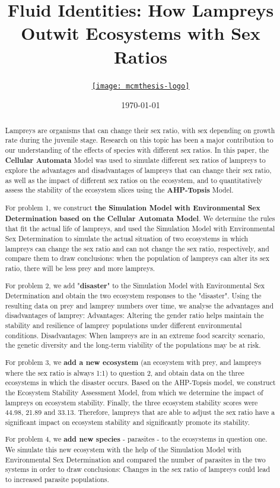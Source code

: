 \documentclass{mcmthesis}
\title{Fluid Identities: How Lampreys Outwit Ecosystems with Sex Ratios}
\author{\small \href{https://www.latexstudio.net/}
  {\texttt{[image: mcmthesis-logo]}}}
\date{\today}
\begin{document}
\begin{abstract}
\par Lampreys are organisms that can change their sex ratio, with sex depending on growth rate during the juvenile stage. Research on this topic has been a major contribution to our understanding of the effects of species with different sex ratios. In this paper, the \textbf{Cellular Automata} Model was used to simulate different sex ratios of lampreys to explore the advantages and disadvantages of lampreys that can change their sex ratio, as well as the impact of different sex ratios on the ecosystem, and to quantitatively assess the stability of the ecosystem slices using the \textbf{AHP-Topsis} Model.

For problem 1, we construct \textbf{the Simulation Model with Environmental Sex Determination based on the Cellular Automata Model}. We determine the rules that fit the actual life of lampreys, and used the Simulation Model with Environmental Sex Determination to simulate the actual situation of two ecosystems in which lampreys can change the sex ratio and can not change the sex ratio, respectively, and compare them to draw conclusions: when the population of lampreys can alter its sex ratio, there will be less prey and more lampreys.

For problem 2, we add "\textbf{disaster}" to the Simulation Model with Environmental Sex Determination and obtain the two ecosystem responses to the "disaster". Using the resulting data on prey and lamprey numbers over time, we analyse the advantages and disadvantages of lamprey: Advantages: Altering the gender ratio helps maintain the stability and resilience of lamprey populations under different environmental conditions. Disadvantages: When lampreys are in an extreme food scarcity scenario, the genetic diversity and the long-term viability of the populations may be at risk.

For problem 3, we \textbf{add a new ecosystem} (an ecosystem with prey, and lampreys where the sex ratio is always 1:1) to question 2, and obtain data on the three ecosystems in which the disaster occurs. Based on the AHP-Topsis model, we construct the Ecosystem Stability Assessment Model, from which we determine the impact of lampreys on ecosystem stability. Finally, the three ecosystem stability scores were 44.98, 21.89 and 33.13. Therefore, lampreys that are able to adjust the sex ratio have a significant impact on ecosystem stability and significantly promote its stability.

For problem 4, we \textbf{add new species} - parasites - to the ecosystems in question one. We simulate this new ecosystem with the help of the Simulation Model with Environmental Sex Determination and compared the number of parasites in the two systems in order to draw conclusions: Changes in the sex ratio of lampreys could lead to increased parasite populations.


\end{abstract}
\end{document}
